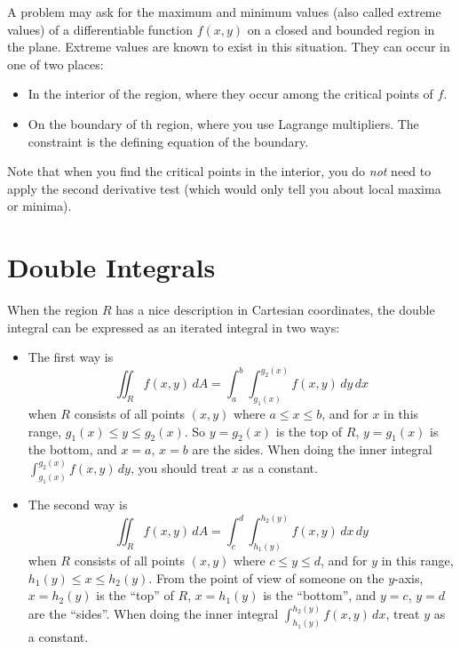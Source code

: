 \begin{fact}
	A problem may ask for the maximum and minimum values (also called extreme
	values) of a differentiable function $f(x, y)$ on a closed and bounded region
	in the plane. Extreme values are known to exist in this situation. They can
	occur in one of two places:
	\begin{itemize}
		\item In the interior of the region, where they occur among the critical
			points of $f$.
		\item On the boundary of th region, where you use Lagrange multipliers. The
			constraint is the defining equation of the boundary.
	\end{itemize}
	Note that when you find the critical points in the interior, you do \emph{not}
	need to apply the second derivative test (which would only tell you about
	local maxima or minima).
\end{fact}

\section*{Double Integrals}

\begin{definition}
	When the region $R$ has a nice description in Cartesian coordinates, the
	double integral can be expressed as an iterated integral in two ways:
	\begin{itemize}
		\item The first way is
			\[
				\iint_R f(x, y)\, dA = \int_a^b \int_{g_1(x)}^{g_2(x)} f(x, y)\,
				dy\, dx
			\]
			when $R$ consists of all points $(x, y)$ where $a \leq x \leq b$, and for
			$x$ in this range, $g_1(x) \leq y \leq g_2(x)$. So $y = g_2(x)$ is the top
			of $R$, $y = g_1(x)$ is the bottom, and $x = a$, $x = b$ are the sides.
			When doing the inner integral $\int_{g_1(x)}^{g_2(x)} f(x, y)\, dy$, you
			should treat $x$ as a constant.
		\item The second way is
			\[
				\iint_R f(x, y)\, dA = \int_c^d \int_{h_1(y)}^{h_2(y)} f(x, y)\, dx\, dy
			\]
			when $R$ consists of all points $(x, y)$ where $c \leq y \leq d$, and for
			$y$ in this range, $h_1(y) \leq x \leq h_2(y)$. From the point of view of
			someone on the $y$-axis, $x = h_2(y)$ is the ``top'' of $R$, $x = h_1(y)$
			is the ``bottom'', and $y = c$, $y = d$ are the ``sides''. When doing the
			inner integral $\int_{h_1(y)}^{h_2(y)} f(x, y)\, dx$, treat $y$ as a
			constant.
	\end{itemize}
\end{definition}

